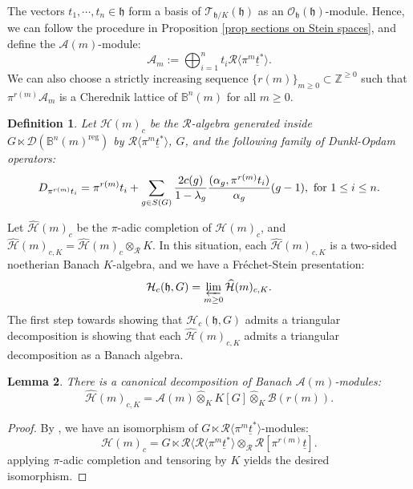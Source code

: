 \documentclass{amsart}
\newtheorem{defi}{ Definition}[subsection]
\newtheorem{Lemma}[defi]{Lemma}
\newcommand{\D}{\mathcal{D}}
\newcommand{\OX}{\mathcal{O}}
\begin{document}
The vectors $t_1,\cdots,t_n \in\mathfrak{h}$ form a basis of $\mathcal{T}_{\mathfrak{h}/K}(\mathfrak{h})$ as an $\OX_\mathfrak{h}(\mathfrak{h})$-module. Hence, we can follow the procedure in Proposition \ref{prop sections on Stein spaces}, and define the $\mathscr{A}(m)$-module:
\begin{equation*}
    \mathcal{A}_m:=\bigoplus_{i=1}^nt_i\mathcal{R}\langle \pi^m\underline{t}^*\rangle. 
\end{equation*}
We can also choose a strictly increasing sequence $\{r(m)\}_{m\geq 0}\subset \mathbb{Z}^{\geq 0}$ such that $\pi^{r(m)}\mathcal{A}_m$ is a Cherednik lattice of $\mathbb{B}^n(m)$ for all $m\geq 0$. 
\begin{defi}
Let $\mathcal{H}(m)_c$ be the $\mathcal{R}$-algebra generated inside $G\ltimes \D(\mathbb{B}^n(m)^{\operatorname{reg}})$ by $\mathcal{R}\langle \pi^m\underline{t}^*\rangle$, $G$, and the following family of Dunkl-Opdam operators:
\begin{equation*}
    D_{\pi^{r(m)}t_i}= \pi^{r(m)}t_i+ \sum_{g\in S(G)}\frac{2c(g)}{1-\lambda_{g}}\frac{(\alpha_g,\pi^{r(m)}t_i)}{\alpha_g}(g-1), \textnormal{ for } 1\leq i\leq n.
\end{equation*}
\end{defi}
Let $\widehat{\mathcal{H}}(m)_c$ be the $\pi$-adic completion of $\mathcal{H}(m)_c$, and $\widehat{\mathcal{H}}(m)_{c,K}=\widehat{\mathcal{H}}(m)_{c}\otimes_{\mathcal{R}}K$. In this situation, each $\widehat{\mathcal{H}}(m)_{c,K}$ is a two-sided noetherian Banach $K$-algebra, and we have a Fréchet-Stein presentation:
\begin{equation*}
    \mathcal{H}_c(\mathfrak{h},G)=\varprojlim_{m\geq 0}\widehat{\mathcal{H}}(m)_{c,K}.
\end{equation*}
The first step towards showing that $\mathcal{H}_c(\mathfrak{h},G)$ admits a triangular decomposition is showing that each $\widehat{\mathcal{H}}(m)_{c,K}$ admits a triangular decomposition as a Banach algebra. 
\begin{Lemma}
There is a canonical decomposition of Banach $\mathscr{A}(m)$-modules:
\begin{equation*}
    \widehat{\mathcal{H}}(m)_{c,K}=\mathscr{A}(m)\widehat{\otimes}_KK[G]\widehat{\otimes}_K\mathscr{B}(r(m)).
\end{equation*}   
\end{Lemma}
\begin{proof}
By \cite[Corollary 4.4.4]{p-adicCheralg}, we have an isomorphism of $G\ltimes \mathcal{R}\langle\pi^m\underline{t}^* \rangle$-modules: 
\begin{equation*}
    \mathcal{H}(m)_{c}=G\ltimes \mathcal{R}\langle\mathcal{R}\langle\pi^m\underline{t}^* \rangle\otimes_{\mathcal{R}}\mathcal{R}[\pi^{r(m)}\underline{t}].
\end{equation*}
applying $\pi$-adic completion and tensoring by $K$ yields the desired isomorphism.
\end{proof}
\end{document}
